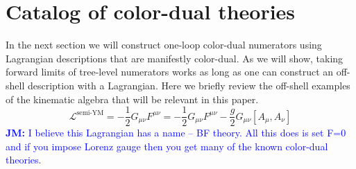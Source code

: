 \documentclass[11pt,letter]{article}
\newcommand{\jm}[1]{\textcolor{blue}{\textbf{JM: }{#1}}}
\def\be{\begin{equation}}
\def\ee{\end{equation}}
\begin{document}
\appendix
\section{Catalog of color-dual theories}
\label{sec:CKLagrangians}
In the next section we will construct one-loop color-dual numerators using Lagrangian descriptions that are manifestly color-dual. As we will show, taking forward limits of tree-level numerators works as long as one can construct an off-shell description with a Lagrangian. Here we briefly review the off-shell examples of the kinematic algebra that will be relevant in this paper. 
\be
\mathcal{L}^{\text{semi-YM}} = - \frac{1}{2} G_{\mu\nu} F^{\mu\nu} = - \frac{1}{2} G_{\mu\nu} F^{\mu\nu} - \frac{g}{2} G_{\mu\nu} [A_\mu, A_\nu]
\ee
\jm{I believe this Lagrangian has a name -- BF theory.  All this does is set F=0 and if you impose Lorenz gauge then you get many of the known color-dual theories.}
\end{document}
